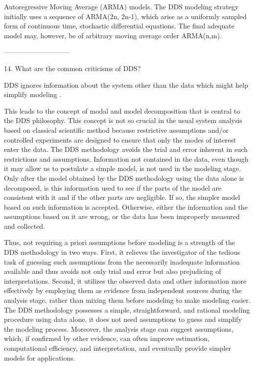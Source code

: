Autoregressive Moving Average (ARMA) models.  The
DDS modeling strategy initially uses a sequence of
ARMA(2n, 2n-1), which arise as a uniformly sampled
form of continuous time, stochastic differential
equations.  The final adequate model may, however,
be of arbitrary moving average order ARMA(n,m).
 
-----------------------------
 
14. What are the common criticisms of DDS?
 
DDS ignores information about the system other
than the data which might help simplify modeling .
 
This leads to the concept of modal and model
decomposition that is central to the DDS
philosophy.  This concept is not so crucial in the
usual system analysis based on classical
scientific method because restrictive assumptions
and/or controlled experiments are designed to
ensure that only the modes of interest enter the
data.  The DDS methodology avoids the trial and
error inherent in such restrictions and
assumptions.  Information not contained in the
data, even though it may allow us to postulate a
simple model, is not used in the modeling stage.
Only after the model obtained by the DDS
methodology using the data alone is decomposed, is
this information used to see if the parts of the
model are consistent with it and if the other
parts are negligible.  If so, the simpler model
based on such information is accepted.  Otherwise,
either the information and the assumptions based
on it are wrong, or the data has been improperly
measured and collected.
 
Thus, not requiring a priori assumptions before
modeling is a strength of the DDS methodology in
two ways.  First, it relieves the investigator of
the tedious task of guessing such assumptions from
the necessarily inadequate information available
and thus avoids not only trial and error but also
prejudicing of interpretations.  Second, it
utilizes the observed data and other information
more effectively by employing them as evidence
from independent sources during the analysis
stage, rather than mixing them before modeling to
make modeling easier.  The DDS methodology
possesses a simple, straightforward, and rational
modeling procedure using data alone, it does not
need assumptions to guess and simplify the
modeling process.  Moreover, the analysis stage
can suggest assumptions, which, if confirmed by
other evidence, can often improve estimation,
computational efficiency, and interpretation, and
eventually provide simpler models for
applications.
 
